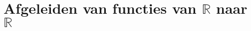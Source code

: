 \documentclass[main.tex]{subfiles}
\begin{document}
\chapter{Afgeleiden van functies van $\mathbb{R}$ naar $\mathbb{R}$}
\label{cha:afgel-van-funct}






\end{document}
